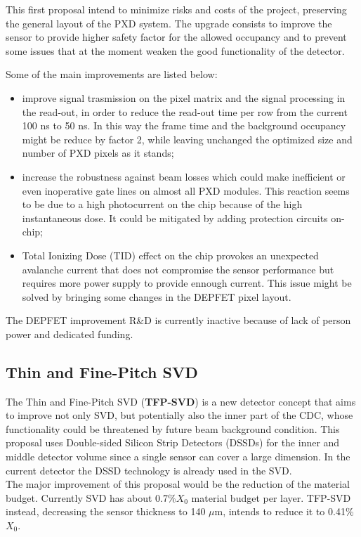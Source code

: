 This first proposal intend to minimize risks and costs of the project, preserving the general layout of the PXD system. The upgrade consists to improve the sensor to provide higher safety factor for the allowed occupancy and to prevent some issues that at the moment weaken the good functionality of the detector.

Some of the main improvements are listed below:

\begin{itemize}
\item improve signal trasmission on the pixel matrix and the signal processing in the read-out, in order to reduce the read-out time per row from the current 100 ns to 50 ns. In this way the frame time and the background occupancy might be reduce by factor 2, while leaving unchanged the optimized size and number of PXD pixels as it stands;
\item increase the robustness against beam losses which could make inefficient or even inoperative gate lines on almost all PXD modules. This reaction seems to be due to a high photocurrent on the chip because of the high instantaneous dose. It could be mitigated by adding protection circuits on-chip;
\item Total Ionizing Dose (TID) effect on the chip provokes an unexpected avalanche current that does not compromise the sensor performance but requires more power supply to provide ennough current. This issue might be solved by bringing some changes in the DEPFET pixel layout.
\end{itemize}

The DEPFET improvement R\&D is currently inactive because of lack of person power and dedicated funding.

\subsection{Thin and Fine-Pitch SVD}

The Thin and Fine-Pitch SVD (\textbf{TFP-SVD}) is a new detector concept that aims to improve not only SVD, but potentially also the inner part of the CDC, whose functionality could be threatened by future beam background condition.
This proposal uses Double-sided Silicon Strip Detectors (DSSDs) for the inner and middle detector volume since a single sensor can cover a large dimension. In the current detector the DSSD technology is already used in the SVD. \\

The major improvement of this proposal would be the reduction of the material budget.
Currently SVD has about 0.7\%$X_{0}$ material budget per layer. TFP-SVD instead, decreasing the sensor thickness to 140 $\mu$m, intends to reduce it to 0.41\%$X_{0}$. 

